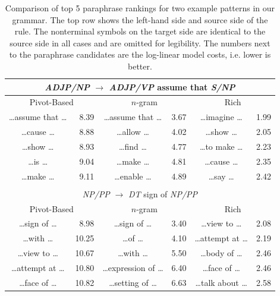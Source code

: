 \documentclass[11pt]{article}
\begin{document}
\begin{table}[!t]
\begin{center}
\begin{tabular}{|cr|cr|cr|}
  \hline
  \multicolumn{6}{|c|}{\emph{ADJP/NP} $\rightarrow$ \emph{ADJP/VP}
    assume that \emph{S/NP}} \\
  \hline
  \multicolumn{2}{|c|}{Pivot-Based} &
  \multicolumn{2}{c|}{$n$-gram} &
  \multicolumn{2}{c|}{Rich} \\
  \hline
  \ldots assume that \ldots & 8.39 &
  \ldots assume that \ldots & 3.67 &
  \ldots imagine \ldots & 1.99 \\

  \ldots cause \ldots & 8.88 &
  \ldots allow \ldots & 4.02 &
  \ldots show \ldots & 2.05 \\

  \ldots show \ldots & 8.93 &
  \ldots find \ldots & 4.77 &
  \ldots to make \ldots & 2.23 \\

  \ldots is \ldots & 9.04 &
  \ldots make \ldots & 4.81 &
  \ldots cause \ldots & 2.35 \\

  \ldots make \ldots & 9.11 &
  \ldots enable \ldots & 4.89 &
  \ldots say \ldots & 2.42 \\

  \hline
  \multicolumn{6}{c}{} \\
  \hline
  \multicolumn{6}{|c|}{\emph{NP/PP} $\rightarrow$ \emph{DT}
    sign of \emph{NP/PP}} \\
  \hline
  \multicolumn{2}{|c|}{Pivot-Based} &
  \multicolumn{2}{c|}{$n$-gram} &
  \multicolumn{2}{c|}{Rich} \\
  \hline

  \ldots sign of \ldots & 8.98 &
  \ldots sign of \ldots & 3.40 &
  \ldots view to \ldots & 2.08 \\

  \ldots with \ldots & 10.25 &
  \ldots of \ldots & 4.10 &
  \ldots attempt at \ldots & 2.19 \\

  \ldots view to \ldots & 10.67 &
  \ldots with \ldots & 5.50 &
  \ldots body of \ldots & 2.46 \\

  \ldots attempt at \ldots & 10.80 &
  \ldots expression of \ldots & 6.40 &
  \ldots face of \ldots & 2.46 \\

  \ldots face of \ldots & 10.82 &
  \ldots setting of \ldots & 6.63 &
  \ldots talk about \ldots & 2.58 \\

  \hline
\end{tabular}
\end{center}
\normalsize
\caption{Comparison of top 5 paraphrase rankings for two example patterns in
  our grammar. The top row shows the left-hand side and source side of
  the rule. The nonterminal symbols on the target side are identical
  to the source side in all cases and are omitted for legibility. The
  numbers next to the paraphrase candidates are the log-linear model
  costs, i.e. lower is better.}
\label{tab-ranking}
\end{table}
\end{document}
